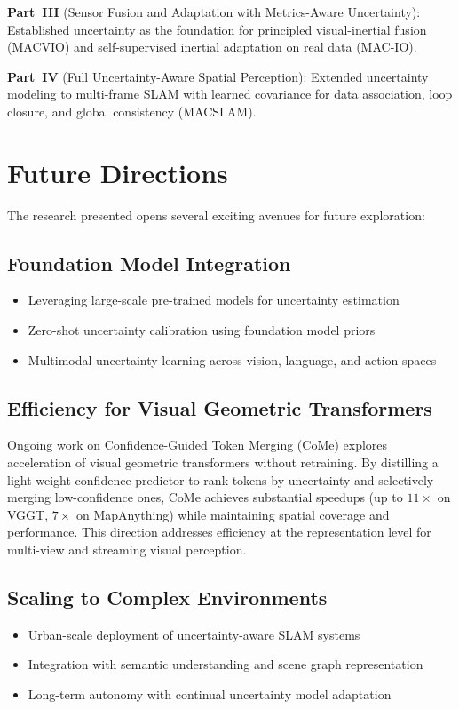 \textbf{Part~III} (Sensor Fusion and Adaptation with Metrics-Aware Uncertainty): Established uncertainty as the foundation for principled visual-inertial fusion (MACVIO) and self-supervised inertial adaptation on real data (MAC-IO).

\textbf{Part~IV} (Full Uncertainty-Aware Spatial Perception): Extended uncertainty modeling to multi-frame SLAM with learned covariance for data association, loop closure, and global consistency (MACSLAM).

\section{Future Directions}

The research presented opens several exciting avenues for future exploration:

\subsection{Foundation Model Integration}
\begin{itemize}
    \item Leveraging large-scale pre-trained models for uncertainty estimation
    \item Zero-shot uncertainty calibration using foundation model priors
    \item Multimodal uncertainty learning across vision, language, and action spaces
\end{itemize}

\subsection{Efficiency for Visual Geometric Transformers}
Ongoing work on Confidence-Guided Token Merging (CoMe) explores acceleration of visual geometric transformers without retraining. By distilling a light-weight confidence predictor to rank tokens by uncertainty and selectively merging low-confidence ones, CoMe achieves substantial speedups (up to $11\times$ on VGGT, $7\times$ on MapAnything) while maintaining spatial coverage and performance. This direction addresses efficiency at the representation level for multi-view and streaming visual perception.

\subsection{Scaling to Complex Environments}
\begin{itemize}
    \item Urban-scale deployment of uncertainty-aware SLAM systems
    \item Integration with semantic understanding and scene graph representation
    \item Long-term autonomy with continual uncertainty model adaptation
\end{itemize}

